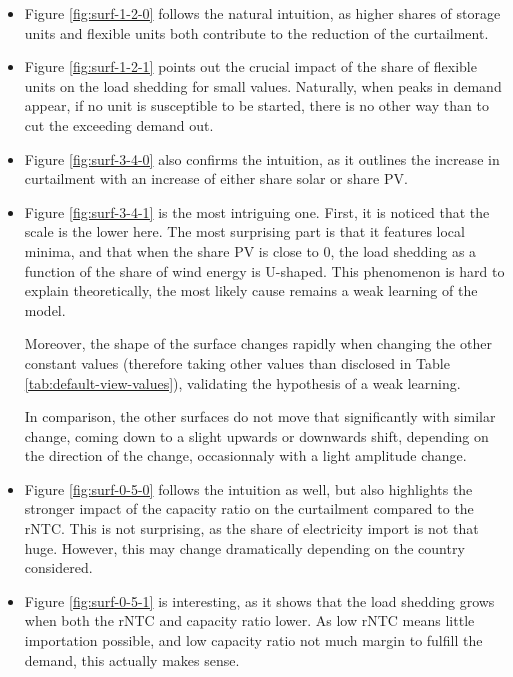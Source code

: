 \begin{itemize}
    \item Figure \ref{fig:surf-1-2-0} follows the natural intuition, as higher shares of storage units and flexible units both contribute to the reduction of the curtailment.
    \item Figure \ref{fig:surf-1-2-1} points out the crucial impact of the share of flexible units on the load shedding for small values. Naturally, when peaks in demand appear, if no unit is susceptible to be started, there is no other way than to cut the exceeding demand out.
    \item Figure \ref{fig:surf-3-4-0} also confirms the intuition, as it outlines the increase in curtailment with an increase of either share solar or share PV.
    \item Figure \ref{fig:surf-3-4-1} is the most intriguing one. First, it is noticed that the scale is the lower here. The most surprising part is that it features local minima, and that when the share PV is close to 0, the load shedding as a function of the share of wind energy is U-shaped. This phenomenon is hard to explain theoretically, the most likely cause remains a weak learning of the model.
    
    Moreover, the shape of the surface changes rapidly when changing the other constant values (therefore taking other values than disclosed in Table \ref{tab:default-view-values}), validating the hypothesis of a weak learning.

    In comparison, the other surfaces do not move that significantly with similar change, coming down to a slight upwards or downwards shift, depending on the direction of the change, occasionnaly with a light amplitude change.
    \item Figure \ref{fig:surf-0-5-0} follows the intuition as well, but also highlights the stronger impact of the capacity ratio on the curtailment compared to the rNTC. This is not surprising, as the share of electricity import is not that huge. However, this may change dramatically depending on the country considered.
    \item Figure \ref{fig:surf-0-5-1} is interesting, as it shows that the load shedding grows when both the rNTC and capacity ratio lower. As low rNTC means little importation possible, and low capacity ratio not much margin to fulfill the demand, this actually makes sense.
\end{itemize}



